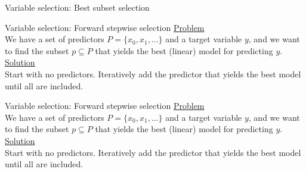 \documentclass[8pt]{beamer}
\begin{document}
     \begin{frame}[t]{Variable selection: Best subset selection} %
     \end{frame}

     \begin{frame}[t]{Variable selection: Forward stepwise selection} %
        \underline{Problem}\\
        We have a set of predictors $P=\{x_0, x_1, ...\}$ and a target variable $y$, and we want to find the subset $p \subseteq P$ that yields the best (linear) model for predicting $y$.\\
        \vspace{0.25cm}
        \underline{Solution}\\
        Start with no predictors. Iteratively add the predictor that yields the best model until all are included.\\
    \end{frame}

    \begin{frame}[t]{Variable selection: Forward stepwise selection} %
        \underline{Problem}\\
        We have a set of predictors $P=\{x_0, x_1, ...\}$ and a target variable $y$, and we want to find the subset $p \subseteq P$ that yields the best (linear) model for predicting $y$.\\
        \vspace{0.25cm}
        \underline{Solution}\\
        Start with no predictors. Iteratively add the predictor that yields the best model until all are included.\\
        \vspace{0.25cm}
        \centering

        \def\nodefont{\fontsize{4}{4}\linespread{0.85}\selectfont}
        \def\hsep{1.6}
        \def\vsep{0.75}
    \end{frame}
\end{document}
